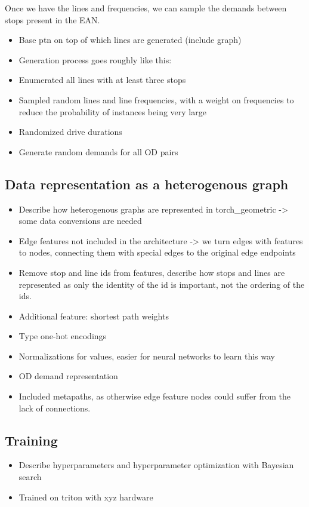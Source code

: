 \documentclass[english, 12pt, a4paper, sci, utf8, a-2b, online]{aaltothesis}
\begin{document}
Once we have the lines and frequencies, we can sample the demands between stops present in the EAN. 


\begin{itemize}
    \item Base ptn on top of which lines are generated (include graph)
    \item Generation process goes roughly like this:
    \item Enumerated all lines with at least three stops
    \item Sampled random lines and line frequencies, with a weight on frequencies to reduce the probability of instances being very large
    \item Randomized drive durations
    \item Generate random demands for all OD pairs
\end{itemize}

\subsection{Data representation as a heterogenous graph}
\begin{itemize}
    \item Describe how heterogenous graphs are represented in torch\_geometric -> some data conversions are needed
    \item Edge features not included in the architecture -> we turn edges with features to nodes, connecting them with special edges to the original edge endpoints
    \item Remove stop and line ids from features, describe how stops and lines are represented as only the identity of the id is important, not the ordering of the ids.
    \item Additional feature: shortest path weights
    \item Type one-hot encodings
    \item Normalizations for values, easier for neural networks to learn this way
    \item OD demand representation
    \item Included metapaths, as otherwise edge feature nodes could suffer from the lack of connections.
\end{itemize}


\subsection{Training}
\begin{itemize}
    \item Describe hyperparameters and hyperparameter optimization with Bayesian search
    \item Trained on triton with xyz hardware
\end{itemize}
\clearpage
\end{document}
